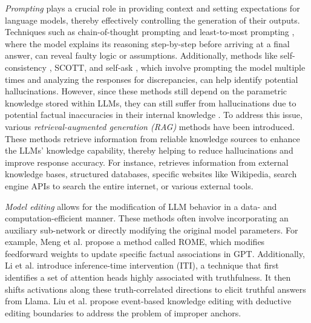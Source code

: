 \textit{Prompting} \cite{liu2023pre} plays a crucial role in providing context and setting expectations for language models, thereby effectively controlling the generation of their outputs. Techniques such as chain-of-thought prompting \cite{wei2022chain} and least-to-most prompting \cite{zhou2022least}, where the model explains its reasoning step-by-step before arriving at a final answer, can reveal faulty logic or assumptions. Additionally, methods like self-consistency \cite{wang2022self}, SCOTT\cite{wang2023scott}, and self-ask \cite{press2022measuring}, which involve prompting the model multiple times and analyzing the responses for discrepancies, can help identify potential hallucinations. However, since these methods still depend on the parametric knowledge stored within LLMs, they can still suffer from hallucinations due to potential factual inaccuracies in their internal knowledge \cite{xu2024hallucination}. To address this issue, various \textit{retrieval-augmented generation (RAG)} \cite{lewis2020retrieval, gao2023retrieval} methods have been introduced. These methods retrieve information from reliable knowledge sources to enhance the LLMs' knowledge capability, thereby helping to reduce hallucinations and improve response accuracy. For instance, \cite{yao2022react, liu2021token, li2023chain, peng2023check, gao2022rarr, agrawal2023can,liu2023tcra, wang2023explainable, yoran2023answering, dhuliawala2023chain, mialon2023augmented, chern2023factool, gou2023critic} retrieves information from external knowledge bases, structured databases, specific websites like Wikipedia, search engine APIs to search the entire internet, or various external tools.

\textit{Model editing} \cite{yao2023editing, wang2023knowledge, de2021editing, mitchell2022memory, sinitsin2020editable, huang2023transformer, meng2022mass, ripple2024, eventedit2024} allows for the modification of LLM behavior in a data- and computation-efficient manner. These methods often involve incorporating an auxiliary sub-network or directly modifying the original model parameters. For example, Meng et al. \cite{meng2022locating} propose a method called ROME, which modifies feedforward weights to update specific factual associations in GPT. Additionally, Li et al. \cite{li2023inference} introduce inference-time intervention (ITI), %
a technique that first identifies a set of attention heads highly associated with truthfulness. It then shifts activations along these truth-correlated directions to elicit truthful answers from Llama.
Liu et al. \cite{liu2024evedit} propose event-based knowledge editing with deductive editing boundaries to address the problem of improper anchors.

